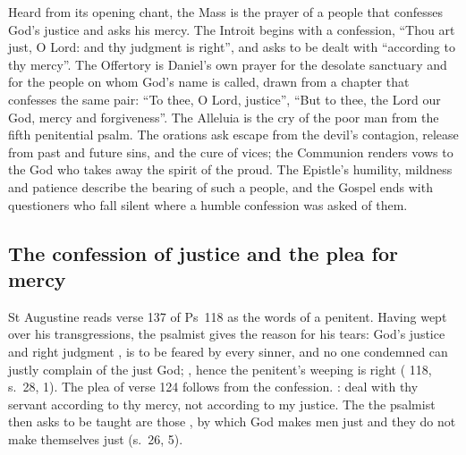 \label{sec:just-judge-merciful-hearer}

Heard from its opening chant, the Mass is the prayer of a people that
confesses God's justice and asks his mercy. The Introit begins with a
confession, ``Thou art just, O Lord: and thy judgment is right'', and asks to
be dealt with ``according to thy mercy''. The Offertory is Daniel's own prayer
for the desolate sanctuary and for the people on whom God's name is called,
drawn from a chapter that confesses the same pair: ``To thee, O Lord,
justice'', ``But to thee, the Lord our God, mercy and forgiveness''. The
Alleluia is the cry of the poor man from the fifth penitential psalm. The
orations ask escape from the devil's contagion, release from past and future
sins, and the cure of vices; the Communion renders vows to the God who takes
away the spirit of the proud. The Epistle's humility, mildness and patience
describe the bearing of such a people, and the Gospel ends with questioners who
fall silent where a humble confession was asked of them.

\subsection{The confession of justice and the plea for mercy}

St Augustine reads verse 137 of Ps~118 as the words of a penitent. Having wept
over his transgressions, the psalmist gives the reason for his tears: God's
justice and right judgment , is to be feared
by every sinner, and no one condemned can justly complain of the just God;
, hence the penitent's weeping is
right ( 118, s.~28, 1). The plea of verse 124
follows from the confession. : deal with thy servant according to
thy mercy, not according to my justice. The  the
psalmist then asks to be taught are those , by which God makes men just and they do not make themselves just
(s.~26, 5).

